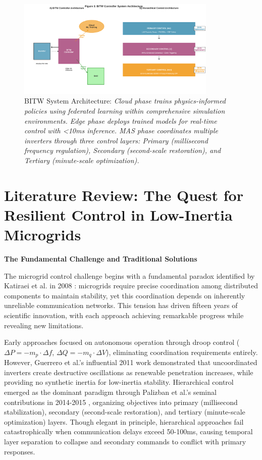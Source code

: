 \documentclass[12pt]{article}
\begin{document}
\begin{figure}[H]
\centering
\includegraphics[width=0.85\textwidth]{figure3_system_architecture.pdf}
\caption{BITW System Architecture: \textit{Cloud phase trains physics-informed policies using federated learning within comprehensive simulation environments. Edge phase deploys trained models for real-time control with <10ms inference. MAS phase coordinates multiple inverters through three control layers: Primary (millisecond frequency regulation), Secondary (second-scale restoration), and Tertiary (minute-scale optimization).}}
\end{figure}

\section{Literature Review: The Quest for Resilient Control in Low-Inertia Microgrids}

\textbf{The Fundamental Challenge and Traditional Solutions}

The microgrid control challenge begins with a fundamental paradox identified by Katiraei et al. in 2008 \cite{katiraei2008}: microgrids require precise coordination among distributed components to maintain stability, yet this coordination depends on inherently unreliable communication networks. This tension has driven fifteen years of scientific innovation, with each approach achieving remarkable progress while revealing new limitations.

Early approaches focused on autonomous operation through droop control ($\Delta P = -m_p \cdot \Delta f$, $\Delta Q = -m_q \cdot \Delta V$), eliminating coordination requirements entirely. However, Guerrero et al.'s influential 2011 work \cite{guerrero2011} demonstrated that uncoordinated inverters create destructive oscillations as renewable penetration increases, while providing no synthetic inertia for low-inertia stability. Hierarchical control emerged as the dominant paradigm through Palizban et al.'s seminal contributions in 2014-2015 \cite{palizban2014,palizban2015}, organizing objectives into primary (millisecond stabilization), secondary (second-scale restoration), and tertiary (minute-scale optimization) layers. Though elegant in principle, hierarchical approaches fail catastrophically when communication delays exceed 50-100ms, causing temporal layer separation to collapse and secondary commands to conflict with primary responses.
\end{document}
